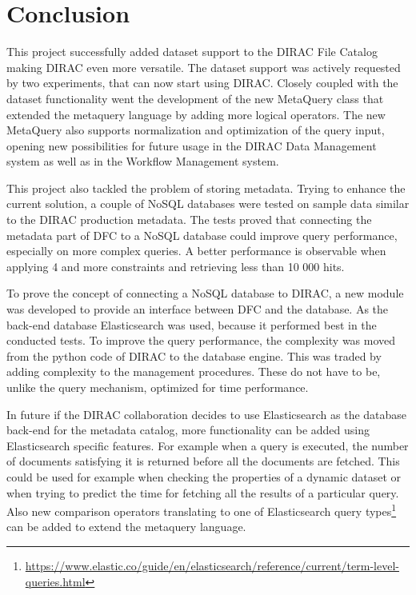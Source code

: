 \chapter*{Conclusion}
\label{chap:conc}

This project successfully added dataset support to the DIRAC File Catalog making DIRAC even more 
versatile. The dataset support was actively requested by two experiments, that can now start using DIRAC. 
Closely coupled with the dataset functionality went the development of the new MetaQuery
class that extended the metaquery language by adding more logical operators. The new MetaQuery also
supports normalization and optimization of the query input, opening new possibilities for future usage
in the DIRAC Data Management system as well as in the Workflow Management system. 

This project also tackled the problem of storing metadata. Trying to enhance the current solution, a couple of NoSQL 
databases were tested on sample data similar to the DIRAC production metadata. The tests proved that connecting the 
metadata part of DFC to a NoSQL database could improve query performance, especially on more complex
queries. A better performance is observable when applying 4 and more constraints and retrieving less than 10 000 
hits.

To prove the concept of connecting a NoSQL database to DIRAC, a new module was developed to provide 
an interface between DFC and the database. As the back-end database Elasticsearch was used, because it performed
best in the conducted tests. To improve the query performance, the complexity was moved from the python code of
DIRAC to the database engine. This was traded by adding complexity to the management procedures. These do not have 
to be, unlike the query mechanism, optimized for time performance.

In future if the DIRAC collaboration decides to use Elasticsearch as the database back-end for the metadata
catalog, more functionality can be added using Elasticsearch specific features. 
For example when a query is executed, the number of documents satisfying it is returned before all the documents are 
fetched. This could be used for example when checking the properties of a dynamic dataset or when trying to predict
the time for fetching all the results of a particular query. Also new comparison 
operators translating to one of Elasticsearch query 
types\footnote{\url{https://www.elastic.co/guide/en/elasticsearch/reference/current/term-level-queries.html}} can be 
added to extend the metaquery language.
